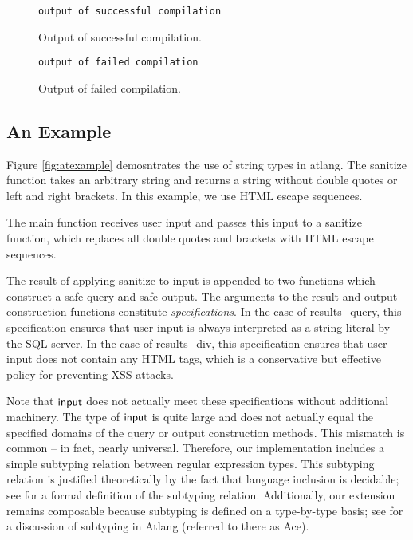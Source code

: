 \documentclass[9pt]{sig-alternate}
\theoremstyle{definition}
\begin{document}
\begin{figure}
\begin{lstlisting}
output of successful compilation
\end{lstlisting}
\caption{Output of successful compilation.}
\end{figure}

\begin{figure}
\begin{lstlisting}
output of failed compilation
\end{lstlisting}
\caption{Output of failed compilation.}
\end{figure}


\subsection{An Example}

Figure \ref{fig:atexample} demosntrates the use of string types in atlang.
The sanitize function takes an arbitrary string and returns a string without
double quotes or left and right brackets. In this example, we use HTML
escape sequences.

The main function receives user input and passes this input to a 
sanitize function, which replaces all double quotes and brackets with HTML
escape sequences. 

The result of applying sanitize to input is appended to two functions which
construct a safe query and safe output.
The arguments to the result and output construction functions constitute \emph{specifications}.
In the case of \textsf{results_query}, this specification ensures that user input is always interpreted
as a string literal by the SQL server.
In the case of \textsf{results_div}, this specification ensures that user input does 
not contain any HTML tags, which is a conservative but effective policy for preventing
XSS attacks.

Note that ${\sf input}$ does not actually meet these specifications without additional machinery.
The type of ${\sf input}$ is quite large
and does not actually equal the specified domains of the query or output construction
methods. This mismatch is common -- in fact, nearly universal. Therefore, 
our implementation includes a simple subtyping relation between regular expression
types. 
This subtyping relation is justified theoretically by the fact that language inclusion is
decidable; see \cite{fulton12} for a formal definition of the subtyping relation.
Additionally, our extension remains composable because subtyping is defined on a type-by-type basis;
see \cite{fulton13} for a discussion of subtyping in Atlang (referred to there as Ace).
\end{document}
